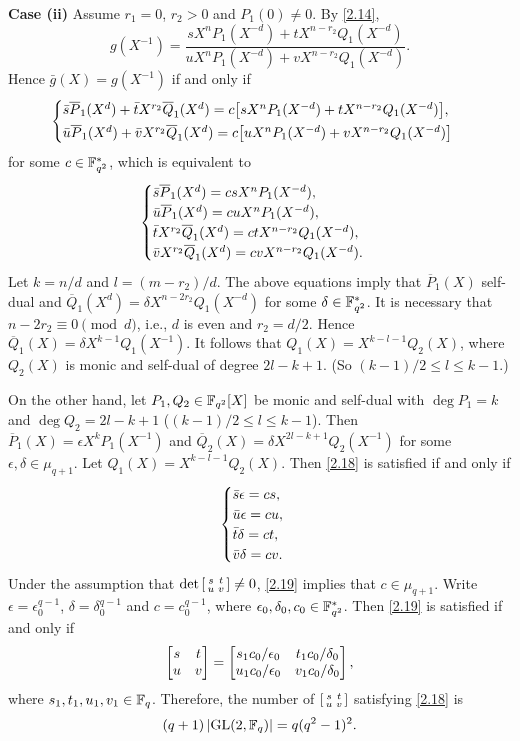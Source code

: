 \documentclass{amsart}
\numberwithin{equation}{section}
\theoremstyle{definition}
\newcommand{\f}{\Bbb F}
\begin{document}
{\bf Case (ii)} Assume $r_1=0$, $r_2>0$ and $P_1(0)\ne 0$. By \eqref{2.14},
\[
g(X^{-1})=\frac{sX^nP_1(X^{-d})+tX^{n-r_2}Q_1(X^{-d})}{uX^nP_1(X^{-d})+vX^{n-r_2}Q_1(X^{-d})}.
\]
Hence $\bar g(X)=g(X^{-1})$ if and only if 
\[
\begin{cases}
\bar s\overline P_1(X^d)+\bar tX^{r_2}\overline Q_1(X^d)=c\bigl[sX^nP_1(X^{-d})+tX^{n-r_2}Q_1(X^{-d})\bigr],\vspace{0.2em}\cr
\bar u\overline P_1(X^d)+\bar vX^{r_2}\overline Q_1(X^d)=c\bigl[uX^nP_1(X^{-d})+vX^{n-r_2}Q_1(X^{-d})\bigr]
\end{cases}
\]
for some $c\in\f_{q^2}^*$, which is equivalent to
\begin{equation}\label{2.18}
\begin{cases}
\bar s\overline P_1(X^d)=csX^nP_1(X^{-d}),\cr
\bar u\overline P_1(X^d)=cuX^nP_1(X^{-d}),\cr
\bar tX^{r_2}\overline Q_1(X^d)=ctX^{n-r_2}Q_1(X^{-d}),\cr
\bar vX^{r_2}\overline Q_1(X^d)=cvX^{n-r_2}Q_1(X^{-d}).
\end{cases}
\end{equation}
Let $k=n/d$ and $l=(m-r_2)/d$. The above equations imply that $\overline P_1(X)$ self-dual and $\overline Q_1(X^d)=\delta X^{n-2r_2}Q_1(X^{-d})$ for some $\delta\in\f_{q^2}^*$. It is necessary that $n-2r_2\equiv 0\pmod d$, i.e., $d$ is even and $r_2=d/2$. Hence $\overline Q_1(X)=\delta X^{k-1}Q_1(X^{-1})$. It follows that $Q_1(X)=X^{k-l-1}Q_2(X)$, where $Q_2(X)$ is monic and self-dual of degree $2l-k+1$. (So $(k-1)/2\le l\le k-1$.)

On the other hand, let $P_1,Q_2\in\f_{q^2}[X]$ be monic and self-dual with $\deg P_1=k$ and $\deg Q_2=2l-k+1$ ($(k-1)/2\le l\le k-1$). Then $\overline P_1(X)=\epsilon X^kP_1(X^{-1})$ and $\overline Q_2(X)=\delta X^{2l-k+1}Q_2(X^{-1})$ for some $\epsilon,\delta\in\mu_{q+1}$. 
Let $Q_1(X)=X^{k-l-1}Q_2(X)$. Then \eqref{2.18} is satisfied if and only if
\begin{equation}\label{2.19}
\begin{cases}
\bar s\epsilon=cs,\cr
\bar u\epsilon=cu,\cr
\bar t\delta=ct,\cr
\bar v\delta=cv.
\end{cases}
\end{equation}
Under the assumption that $\det\left[\begin{smallmatrix}s&t\cr u&v\end{smallmatrix}\right]\ne 0$, \eqref{2.19} implies that $c\in\mu_{q+1}$. Write $\epsilon=\epsilon_0^{q-1}$, $\delta=\delta_0^{q-1}$ and $c=c_0^{q-1}$, where $\epsilon_0,\delta_0,c_0\in\f_{q^2}^*$. Then \eqref{2.19} is satisfied if and only if
\[
\left[\begin{matrix}s&t\cr u&v\end{matrix}\right]=\left[\begin{matrix}s_1c_0/\epsilon_0&t_1c_0/\delta_0\cr u_1c_0/\epsilon_0&v_1c_0/\delta_0\end{matrix}\right],
\]
where $s_1,t_1,u_1,v_1\in\f_q$. Therefore, the number of $\left[\begin{smallmatrix}s&t\cr u&v\end{smallmatrix}\right]$ satisfying \eqref{2.18} is
\[
(q+1)\,|\text{GL}(2,\f_q)|=q(q^2-1)^2.
\]
\end{document}
